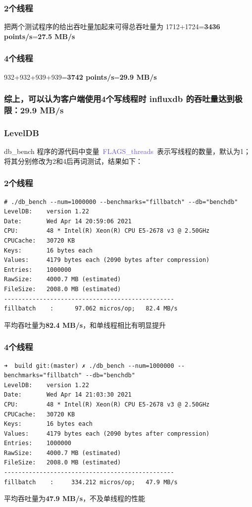 \documentclass{article}
\newcommand{\code}[1]{{~\fontspec{Book Antiqua}\textcolor{SlateBlue}{#1}~}}%
\begin{document}
\subsubsection*{2个线程}
把两个测试程序的给出吞吐量加起来可得总吞吐量为 1712+1724=\textbf{3436 points/s}=\textbf{27.5 MB/s}

\subsubsection*{4个线程}
932+932+939+939=\textbf{3742 points/s}=\textbf{29.9 MB/s}

\subsubsection*{综上，可以认为客户端使用4个写线程时 influxdb 的吞吐量达到极限：29.9 MB/s}

\subsubsection{LevelDB}
db\_bench 程序的源代码中变量\code{FLAGS\_threads}表示写线程的数量，默认为1；将其分别修改为2和4后再词测试，结果如下：

\subsubsection*{2个线程}
\begin{lstlisting}
# ./db_bench --num=1000000 --benchmarks="fillbatch" --db="benchdb"
LevelDB:    version 1.22
Date:       Wed Apr 14 20:59:06 2021
CPU:        48 * Intel(R) Xeon(R) CPU E5-2678 v3 @ 2.50GHz
CPUCache:   30720 KB
Keys:       16 bytes each
Values:     4179 bytes each (2090 bytes after compression)
Entries:    1000000
RawSize:    4000.7 MB (estimated)
FileSize:   2008.0 MB (estimated)
------------------------------------------------
fillbatch    :      97.062 micros/op;   82.4 MB/s
\end{lstlisting}
平均吞吐量为\textbf{82.4 MB/s}，和单线程相比有明显提升

\subsubsection*{4个线程}
\begin{lstlisting}
➜  build git:(master) ✗ ./db_bench --num=1000000 --benchmarks="fillbatch" --db="benchdb"
LevelDB:    version 1.22
Date:       Wed Apr 14 21:03:30 2021
CPU:        48 * Intel(R) Xeon(R) CPU E5-2678 v3 @ 2.50GHz
CPUCache:   30720 KB
Keys:       16 bytes each
Values:     4179 bytes each (2090 bytes after compression)
Entries:    1000000
RawSize:    4000.7 MB (estimated)
FileSize:   2008.0 MB (estimated)
------------------------------------------------
fillbatch    :     334.212 micros/op;   47.9 MB/s
\end{lstlisting}
平均吞吐量为\textbf{47.9 MB/s}，不及单线程的性能
\end{document}
